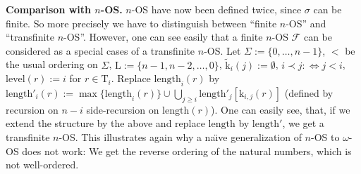 \documentclass[10pt]{article}
\def \laprint#1{{ \label {#1}} \expandafter \global 
    \def \actlabel{#1}}
\def \ssubitem#1{\item \label{\actlabel#1} }
\def \refsub#1#2{\ref{#1#2}}                    %
\def \refact#1{\ref{\actlabel#1}}               %
\newtheorem {deflemma} [lemma]{Definition and Lemma}
\def\all{\forall}
\def \Iff{\Leftrightarrow}
\def\length{\mathrm{length}}
\def\k{\mathrm{k}}
\def\krmtil{\widetilde{\mathrm{k}}}
\def\krmvec{\vec{\mathrm{k}}}
\def\calGvec{\vec{\mathcal G}}
\def\C{\mathrm{C}}
\def\T{\mathrm{T}}
\def\M{\mathrm{M}}
\def\L{\mathrm{L}}
\def\level{\mathrm{level}}
\def\calF{\mathcal{F}}
\def \Avec{{\vec A}}
\begin{document}
%
%
%
{\bf Comparison with $n$-OS.} $n$-OS have now been defined twice,
since $\sigma$ can be finite. So more precisely we have to
distinguish between ``finite $n$-OS'' and ``transfinite $n$-OS''.
However, one can
see easily that a finite $n$-OS $\calF$ can be considered as a 
special cases of a transfinite $n$-OS. 
Let $\Sigma:= \{ 0 ,\ldots, n-1 \} $, $<$ be the usual ordering on 
$\Sigma$, $\L:= \{ n-1, n-2 ,\ldots, 0 \} $, $\krmtil_i(j):= \emptyset$,
$i \prec j :\Iff j < i$, $\level(r):= i$  for $r \in \T_i$. Replace
$\length_i(r)$ by $\length'_i(r):=
\max \{ \length_i(r) \} \cup \bigcup_{j \geq i}\length'_j[\k_{i,j}(r)]$
(defined by recursion on $n-i$ side-recursion on $\length(r)$).
One can easily see, that, if we extend
the structure by the above and replace $\length$ by
$\length'$, we get 
a transfinite $n$-OS. This illustrates again why
a na{\"{\i}}ve generalization of  $n$-OS to $\omega$-OS does not
work: We get the reverse  ordering of the natural numbers,
which is not well-ordered.
%
%
\end{document}
